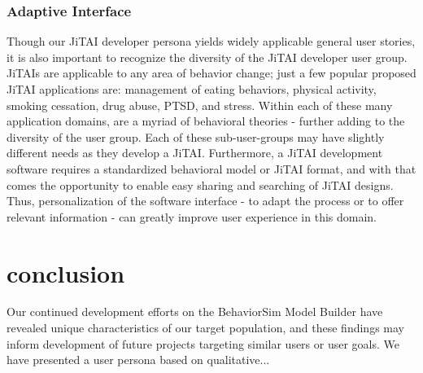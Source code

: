 \documentclass{sigchi}
\begin{document}
\subsubsection{Adaptive Interface}
Though our JiTAI developer persona yields widely applicable general user stories, it is also important to recognize the diversity of the JiTAI developer user group.
JiTAIs are applicable to any area of behavior change; just a few popular proposed JiTAI applications are: management of eating behaviors, physical activity, smoking cessation, drug abuse, PTSD, and stress.
Within each of these many application domains, are a myriad of behavioral theories - further adding to the diversity of the user group.
Each of these sub-user-groups may have slightly different needs as they develop a JiTAI.
Furthermore, a JiTAI development software requires a standardized behavioral model or JiTAI format, and with that comes the opportunity to enable easy sharing and searching of JiTAI designs.
Thus, personalization of the software interface - to adapt the process or to offer relevant information\cite{kay2012creating} - can greatly improve user experience in this domain.

\section{conclusion}
Our continued development efforts on the BehaviorSim Model Builder have revealed unique characteristics of our target population, and these findings may inform development of future projects targeting similar users or user goals.
We have presented a user persona based on qualitative...


%
%
%
%
%
\balance{}



\end{document}
